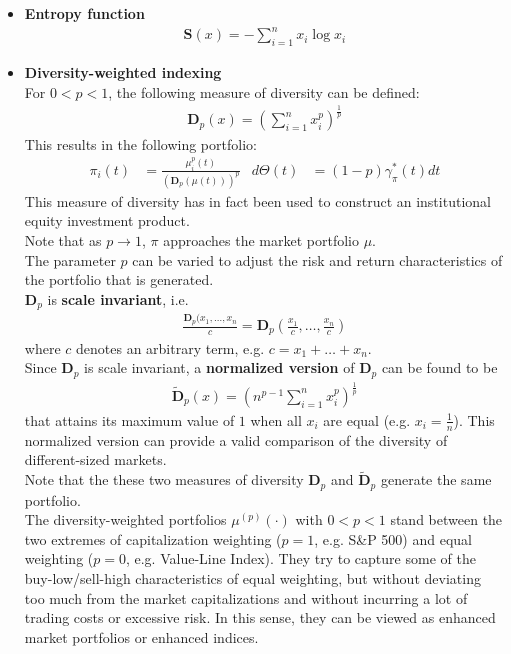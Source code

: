 \documentclass[a4paper,landscape,8pt,fleqn]{scrartcl}
\renewcommand{\emph}[1]{\textbf{#1}}
\begin{document}
\begin{multicols*}{3}
\begin{itemize}
\item \emph{Entropy function}
\begin{align*}
\pmb{S}(x) = - \sum_{i=1}^n x_i \log x_i
\end{align*}
\item \emph{Diversity-weighted indexing} \\
For $0 < p < 1$, the following measure of diversity can be defined:
\begin{align*}
\pmb{D}_p(x) = \left( \sum_{i=1}^n x_i^p \right)^{\frac{1}{p}}
\end{align*}
This results in the following portfolio:
\begin{align*}
\pi_i(t) &= \frac{\mu_i^p(t)}{\left( \pmb{D}_p(\mu(t)) \right)^p} & d\Theta(t) &= (1-p) \gamma_\pi^\ast(t)dt
\end{align*}
This measure of diversity has in fact been used to construct an institutional equity investment product. \\
Note that as $p \rightarrow 1$, $\pi$ approaches the market portfolio $\mu$. \\
The parameter $p$ can be varied to adjust the risk and return characteristics of the portfolio that is generated. \\
$\pmb{D}_p$ is \emph{scale invariant}, i.e.
\begin{align*}
\frac{\pmb{D}_p(x_1, \ldots, x_n}{c} = \pmb{D}_p \left( \frac{x_1}{c}, \ldots, \frac{x_n}{c}  \right)
\end{align*}
where $c$ denotes an arbitrary term, e.g. $c = x_1 + \ldots + x_n$. \\
Since $\pmb{D}_p$ is scale invariant, a \emph{normalized version} of $\pmb{D}_p$ can be found to be
\begin{align*}
\pmb{\tilde D}_p(x) = \left( n^{p-1} \sum_{i=1}^n x_i^p \right)^{\frac{1}{p}}
\end{align*}
that attains its maximum value of $1$ when all $x_i$ are equal (e.g. $x_i = \frac{1}{n}$). This normalized version can provide a valid comparison of the diversity of different-sized markets. \\
Note that the these two measures of diversity $\pmb{D}_p$ and $\pmb{\tilde D}_p$ generate the same portfolio. \\
The diversity-weighted portfolios $\mu^{(p)}(\cdot)$ with $0<p<1$ stand between the two extremes of capitalization weighting ($p=1$, e.g. S\&P 500) and equal weighting ($p=0$, e.g. Value-Line Index). They try to capture some of the buy-low/sell-high characteristics of equal weighting, but without deviating too much from the market capitalizations and without incurring a lot of trading costs or excessive risk. In this sense, they can be viewed as enhanced market portfolios or enhanced indices.

\end{itemize}
\end{multicols*}
\end{document}

